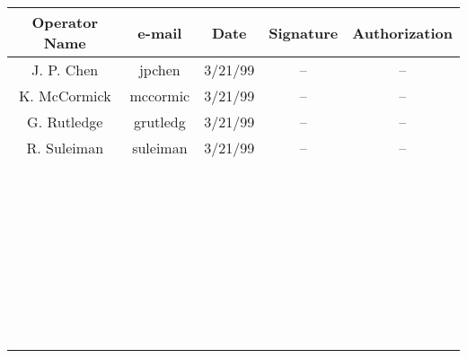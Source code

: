 {\begin{center}
\begin{tabular}{|c|c|c|c|c|}
\hline 
Operator Name&e-mail&
 Date&
 Signature&
 Authorization\\
\hline 
J. P. Chen&jpchen&
 3/21/99&
 --&
 --\\
\hline 
K. McCormick&mccormic&
 3/21/99&
 --&
 --\\
\hline 
G. Rutledge&grutledg&
 3/21/99&
 --&
 --\\
\hline 
R. Suleiman&suleiman&
3/21/99&
--&
--\\
\hline 
&&
&
&
\\
\hline 
&&
&
&
\\
\hline 
&&
&
&
\\
\hline 
&&
&
&
\\
\hline 
&&
&
&
\\
\hline 
&&
&
&
\\
\hline 
&&
&
&
\\
\hline 
&&
&
&
\\
\hline 
&&
&
&
\\
\hline 
&&
&
&
\\
\hline 
&&
&
&
\\
\hline 
&&
&
&
\\
\hline 
&&
&
&
\\
\hline 
&&
&
&
\\
\hline 
&&
&
&
\\
\hline 
&&
&
&
\\
\hline 
&&
&
&
\\
\hline 
&&
&
&
\\
\hline 
&&
&
&
\\
\hline 
&&
&
&
\\
\hline 
&&
&
&
\\
\hline 
&&
&
&
\\
\hline 
&&
&
&
\\
\hline 
&&
&
&
\\
\hline 
&&
&
&
\\
\hline 
&&
&
&
\\
\hline 
&&
&
&
\\
\hline 
&&
&
&
\\
\hline 
&&
&
&
\\
\hline 
&&
&
&
\\
\hline 
&&
&
&
\\
\hline 
&&
&
&
\\
\hline 
&&
&
&
\\
\hline 
&&
&
&
\\
\hline 
&&
&
&
 \\
\hline 
\end{tabular}
\end{center}

\vspace{0.3cm}

}

